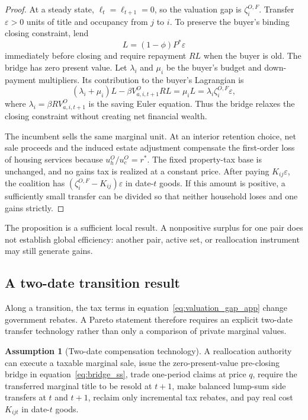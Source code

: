\documentclass[11pt]{article}
\theoremstyle{definition}
\newtheorem{assumption}{Assumption}
\theoremstyle{remark}
\begin{document}
\begin{proof}
At a steady state, $\ell_t=\ell_{t+1}=0$, so the valuation gap is
$\zeta_i^{O,F}$.  Transfer $\varepsilon>0$ units of title and occupancy from
$j$ to $i$.  To preserve the buyer's binding closing constraint, lend
\begin{equation}
 L=(1-\phi)P^*\varepsilon
 \label{eq:bridge_ss}
\end{equation}
immediately before closing and require repayment $RL$ when the buyer is old.
The bridge has zero present value.  Let $\lambda_i$ and $\mu_i$ be the buyer's
budget and down-payment multipliers.  Its contribution to the buyer's
Lagrangian is
\begin{equation}
 (\lambda_i+\mu_i)L-\beta V_{a,i,t+1}^ORL
 =\mu_iL=\lambda_i\zeta_i^{O,F}\varepsilon,
 \label{eq:bridge_value_ss}
\end{equation}
where $\lambda_i=\beta RV_{a,i,t+1}^O$ is the saving Euler equation.  Thus the
bridge relaxes the closing constraint without creating net financial wealth.

The incumbent sells the same marginal unit.  At an interior retention choice,
net sale proceeds and the induced estate adjustment compensate the first-order
loss of housing services because $u_h^O/u_c^O=r^*$.  The fixed property-tax base
is unchanged, and no gains tax is realized at a constant price.  After paying
$K_{ij}\varepsilon$, the coalition has
$(\zeta_i^{O,F}-K_{ij})\varepsilon$ in date-$t$ goods.  If this amount is
positive, a sufficiently small transfer can be divided so that neither
household loses and one gains strictly.
\end{proof}

The proposition is a sufficient local result.  A nonpositive surplus for one
pair does not establish global efficiency: another pair, active set, or
reallocation instrument may still generate gains.

\subsection{A two-date transition result}

Along a transition, the tax terms in equation~\eqref{eq:valuation_gap_app}
change government rebates.  A Pareto statement therefore requires an explicit
two-date transfer technology rather than only a comparison of private marginal
values.

\begin{assumption}[Two-date compensation technology]
A reallocation authority can execute a taxable marginal sale, issue the
zero-present-value pre-closing bridge in equation~\eqref{eq:bridge_ss}, trade
one-period claims at price $q$, require the transferred marginal title to be
resold at $t+1$, make balanced lump-sum side transfers at $t$ and $t+1$,
reclaim only incremental tax rebates, and pay real cost $K_{ijt}$ in date-$t$
goods.
\label{ass:two_date_transfer}
\end{assumption}
\end{document}
